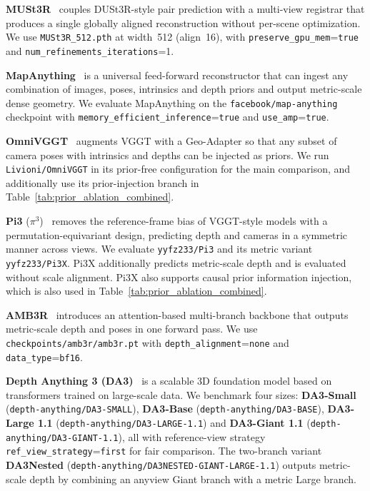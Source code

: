 \textbf{MUSt3R}~\citep{cabon2025must3r} couples DUSt3R-style pair prediction with a multi-view registrar that produces a single globally aligned reconstruction without per-scene optimization.
%
We use \texttt{MUSt3R\_512.pth} at width~512 (align~16), with \texttt{preserve\_gpu\_mem}=\texttt{true} and \texttt{num\_refinements\_iterations}=1.

\textbf{MapAnything}~\citep{keetha2026mapanything} is a universal feed-forward reconstructor that can ingest any combination of images, poses, intrinsics and depth priors and output metric-scale dense geometry.
%
We evaluate MapAnything on the \texttt{facebook/map-anything} checkpoint with \texttt{memory\_efficient\_inference}=\texttt{true} and \texttt{use\_amp}=\texttt{true}.

\textbf{OmniVGGT}~\citep{peng2025omnivggt} augments VGGT with a Geo-Adapter so that any subset of camera poses with intrinsics and depths can be injected as priors.
%
We run \texttt{Livioni/OmniVGGT} in its prior-free configuration for the main comparison, and additionally use its prior-injection branch in Table~\ref{tab:prior_ablation_combined}.

\textbf{Pi3} (\textbf{$\pi^{3}$})~\citep{wang2025pi3} removes the reference-frame bias of VGGT-style models with a permutation-equivariant design, predicting depth and cameras in a symmetric manner across views.
%
We evaluate \texttt{yyfz233/Pi3} and its metric variant \texttt{yyfz233/Pi3X}.
%
Pi3X additionally predicts metric-scale depth and is evaluated without scale alignment.
%
Pi3X also supports causal prior information injection, which is also used in Table~\ref{tab:prior_ablation_combined}.

\textbf{AMB3R}~\citep{wang2025amb3r} introduces an attention-based multi-branch backbone that outputs metric-scale depth and poses in one forward pass.
%
We use \texttt{checkpoints/amb3r/amb3r.pt} with \texttt{depth\_alignment}=\texttt{none} and \texttt{data\_type}=\texttt{bf16}.

\textbf{Depth Anything 3 (DA3)}~\citep{lin2025depth} is a scalable 3D foundation model based on transformers trained on large-scale data.
%
We benchmark four sizes: \textbf{DA3-Small} (\texttt{depth-anything/DA3-SMALL}), \textbf{DA3-Base} (\texttt{depth-anything/DA3-BASE}), \textbf{DA3-Large 1.1} (\texttt{depth-anything/DA3-LARGE-1.1}) and \textbf{DA3-Giant 1.1} (\texttt{depth-anything/DA3-GIANT-1.1}), all with reference-view strategy \texttt{ref\_view\_strategy}=\texttt{first} for fair comparison.
%
The two-branch variant \textbf{DA3Nested} (\texttt{depth-anything/DA3NESTED-GIANT-LARGE-1.1}) outputs metric-scale depth by combining an anyview Giant branch with a metric Large branch.
%

